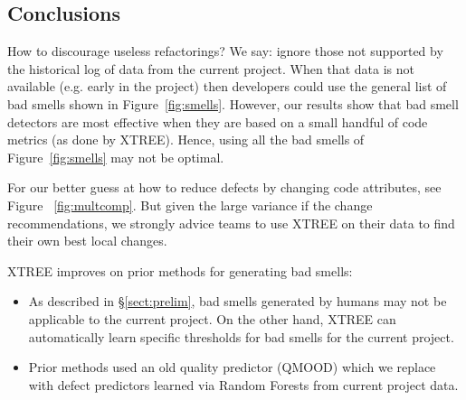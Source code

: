 \documentclass[twocolumn,5p]{elsarticle}
\newcommand{\tion}[1]{\S\ref{sect:#1}}
\newcommand{\fig}[1]{Figure~\ref{fig:#1}}
\theoremstyle{break}
\begin{document}
\begin{itemize}
		
		
		
		
		
		
		
		\section{Conclusions}
		How to discourage useless refactorings?
		We say: ignore those not supported by the historical log of data from
		the current project.  
		When that data is not available (e.g. early
		in the project) then developers could use the general list of
		bad smells shown in \fig{smells}. However, 
		our results
		show that  bad smell detectors are most
		effective when they are based
		on a small handful of code metrics (as done by XTREE).
		Hence, using all the bad smells of \fig{smells} may not be optimal. 
		
		For our better guess at how to reduce defects by changing code attributes,
		see  Figure ~\ref{fig:multcomp}. But given the large variance if the change recommendations, we strongly advice teams to use
		XTREE on their data to find their own best local changes.
		
		XTREE improves on prior methods for generating bad smells:
		\begin{itemize}
			\item As described in \tion{prelim}, bad smells generated by humans may not be applicable to the current project. On the other hand, XTREE can automatically learn specific thresholds
			for bad smells for the current project.
			\item Prior methods used an old quality predictor (QMOOD) which we replace with defect predictors learned via Random Forests
			from   current project data.
			

\end{itemize}
\end{itemize}
\end{document}
